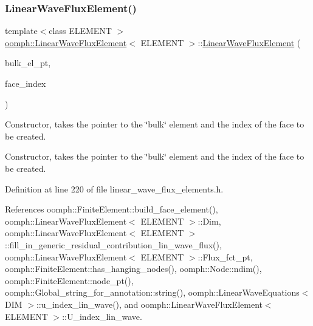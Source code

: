 \subsubsection{\texorpdfstring{Linear\+Wave\+Flux\+Element()}{LinearWaveFluxElement()}\hspace{0.1cm}{\footnotesize\ttfamily [1/3]}}
{\footnotesize\ttfamily template$<$class E\+L\+E\+M\+E\+NT $>$ \\
\hyperlink{classoomph_1_1LinearWaveFluxElement}{oomph\+::\+Linear\+Wave\+Flux\+Element}$<$ E\+L\+E\+M\+E\+NT $>$\+::\hyperlink{classoomph_1_1LinearWaveFluxElement}{Linear\+Wave\+Flux\+Element} (\begin{DoxyParamCaption}\item[{\hyperlink{classoomph_1_1FiniteElement}{Finite\+Element} $\ast$}]{bulk\+\_\+el\+\_\+pt,  }\item[{const int \&}]{face\+\_\+index }\end{DoxyParamCaption})}



Constructor, takes the pointer to the \char`\"{}bulk\char`\"{} element and the index of the face to be created. 

Constructor, takes the pointer to the \char`\"{}bulk\char`\"{} element and the index of the face to be created. 

Definition at line 220 of file linear\+\_\+wave\+\_\+flux\+\_\+elements.\+h.



References oomph\+::\+Finite\+Element\+::build\+\_\+face\+\_\+element(), oomph\+::\+Linear\+Wave\+Flux\+Element$<$ E\+L\+E\+M\+E\+N\+T $>$\+::\+Dim, oomph\+::\+Linear\+Wave\+Flux\+Element$<$ E\+L\+E\+M\+E\+N\+T $>$\+::fill\+\_\+in\+\_\+generic\+\_\+residual\+\_\+contribution\+\_\+lin\+\_\+wave\+\_\+flux(), oomph\+::\+Linear\+Wave\+Flux\+Element$<$ E\+L\+E\+M\+E\+N\+T $>$\+::\+Flux\+\_\+fct\+\_\+pt, oomph\+::\+Finite\+Element\+::has\+\_\+hanging\+\_\+nodes(), oomph\+::\+Node\+::ndim(), oomph\+::\+Finite\+Element\+::node\+\_\+pt(), oomph\+::\+Global\+\_\+string\+\_\+for\+\_\+annotation\+::string(), oomph\+::\+Linear\+Wave\+Equations$<$ D\+I\+M $>$\+::u\+\_\+index\+\_\+lin\+\_\+wave(), and oomph\+::\+Linear\+Wave\+Flux\+Element$<$ E\+L\+E\+M\+E\+N\+T $>$\+::\+U\+\_\+index\+\_\+lin\+\_\+wave.

\mbox{\label{classoomph_1_1LinearWaveFluxElement_aa87a90e74c1f27929ab60d7fef3044fd}} 

